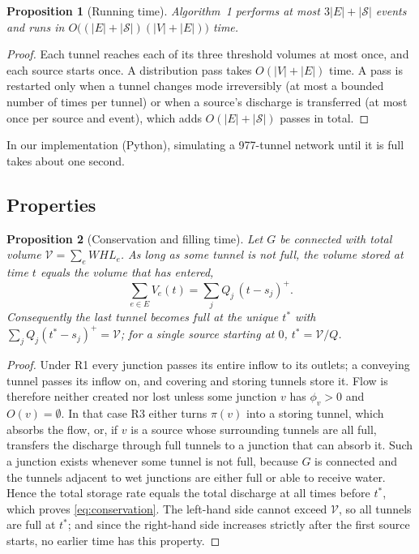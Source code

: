 \documentclass[11pt,a4paper]{article}
\theoremstyle{plain}
\newtheorem{proposition}{Proposition}
\theoremstyle{definition}
\theoremstyle{remark}
\begin{document}
\begin{proposition}[Running time]\label{prop:time}
Algorithm~1 performs at most $3|E| + |\mathcal{S}|$ events and runs in $O\bigl((|E| + |\mathcal{S}|)(|V| + |E|)\bigr)$ time.
\end{proposition}
\begin{proof}
Each tunnel reaches each of its three threshold volumes at most once, and each source starts once. A distribution pass takes $O(|V| + |E|)$ time. A pass is restarted only when a tunnel changes mode irreversibly (at most a bounded number of times per tunnel) or when a source's discharge is transferred (at most once per source and event), which adds $O(|E| + |\mathcal{S}|)$ passes in total.
\end{proof}

In our implementation (Python), simulating a 977-tunnel network until it is full takes about one second.

\subsection{Properties}

\begin{proposition}[Conservation and filling time]\label{prop:conservation}
Let $G$ be connected with total volume $\mathcal{V} = \sum_{e} W H L_e$. As long as some tunnel is not full, the volume stored at time $t$ equals the volume that has entered,
\begin{equation}
  \sum_{e\in E} V_e(t) = \sum_{j} Q_j\,(t - s_j)^+ .
  \label{eq:conservation}
\end{equation}
Consequently the last tunnel becomes full at the unique $t^*$ with $\sum_j Q_j (t^* - s_j)^+ = \mathcal{V}$; for a single source starting at $0$, $t^* = \mathcal{V}/Q$.
\end{proposition}
\begin{proof}
Under R1 every junction passes its entire inflow to its outlets; a conveying tunnel passes its inflow on, and covering and storing tunnels store it. Flow is therefore neither created nor lost unless some junction $v$ has $\phi_v > 0$ and $O(v) = \emptyset$. In that case R3 either turns $\pi(v)$ into a storing tunnel, which absorbs the flow, or, if $v$ is a source whose surrounding tunnels are all full, transfers the discharge through full tunnels to a junction that can absorb it. Such a junction exists whenever some tunnel is not full, because $G$ is connected and the tunnels adjacent to wet junctions are either full or able to receive water. Hence the total storage rate equals the total discharge at all times before $t^*$, which proves \eqref{eq:conservation}. The left-hand side cannot exceed $\mathcal{V}$, so all tunnels are full at $t^*$; and since the right-hand side increases strictly after the first source starts, no earlier time has this property.
\end{proof}
\end{document}
